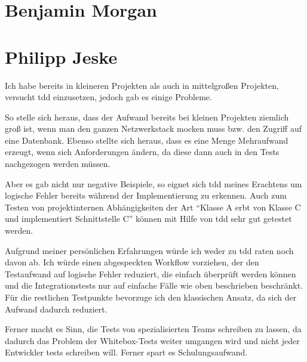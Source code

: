 \documentclass{mitschrift}
\newcommand{\pje}{\marginpar{Philipp\\Jeske}}
\newcommand{\bmn}{\marginpar{Benjamin\\Morgan}}
\begin{document}
\section{Benjamin Morgan}
\bmn

\section{Philipp Jeske}
\pje
Ich habe bereits in kleineren Projekten als auch in mittelgroßen Projekten,
versucht \gls{tdd} einzusetzen, jedoch gab es einige Probleme. 

So stelle sich heraus, dass der Aufwand bereits bei kleinen Projekten ziemlich
groß ist, wenn man den ganzen Netzwerkstack mocken muss bzw. den Zugriff auf
eine Datenbank. Ebenso stellte sich heraus, dass es eine Menge Mehraufwand
erzeugt, wenn sich Anforderungen ändern, da diese dann auch in den Tests
nachgezogen werden müssen.

Aber es gab nicht nur negative Beispiele, so eignet sich \gls{tdd} meines
Erachtens um logische Fehler bereits während der Implementierung zu erkennen.
Auch zum Testen von projektinternen Abhängigkeiten der Art "`Klasse A erbt von
Klasse C und implementiert Schnittstelle C"' können mit Hilfe von \gls{tdd}
sehr gut getestet werden.

Aufgrund meiner persönlichen Erfahrungen würde ich weder zu \gls{tdd} raten
noch davon ab. Ich würde einen abgespeckten Workflow vorziehen, der den
Testaufwand auf logische Fehler reduziert, die einfach überprüft werden können
und die Integrationstests nur auf einfache Fälle wie oben beschrieben
beschränkt. Für die restlichen Testpunkte bevorzuge ich den klassischen Ansatz,
da sich der Aufwand dadurch reduziert.

Ferner macht es Sinn, die Tests von spezialisierten Teams schreiben zu lassen,
da dadurch das Problem der Whitebox-Tests weiter umgangen wird und nicht jeder
Entwickler tests schreiben will. Ferner spart es Schulungsaufwand.




\printglossary
\end{document}
